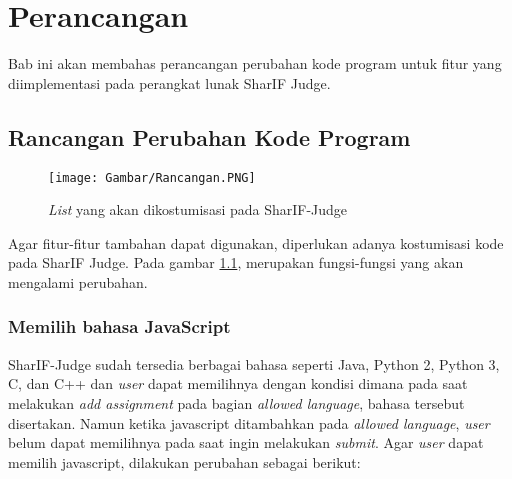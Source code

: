 \chapter{Perancangan}
\label{chap: Perancangan}
Bab ini akan membahas perancangan perubahan kode program untuk fitur yang diimplementasi pada perangkat lunak SharIF Judge.

\section{Rancangan Perubahan Kode Program}
\label{sec: Rancangan Perubahan Kode Program}
\begin{figure}[h!]
     \centering
     \texttt{[image: Gambar/Rancangan.PNG]}
     \caption{\textit{List} yang akan dikostumisasi pada SharIF-Judge}
     \label{fig:Rancangan}
 \end{figure}
 Agar fitur-fitur tambahan dapat digunakan, diperlukan adanya kostumisasi kode pada SharIF Judge. Pada gambar \ref{fig:Rancangan}, merupakan fungsi-fungsi yang akan mengalami perubahan.
 
 \subsection{Memilih bahasa JavaScript}
 SharIF-Judge sudah tersedia berbagai bahasa seperti Java, Python 2, Python 3, C, dan C++ dan \textit{user} dapat memilihnya dengan kondisi dimana pada saat melakukan \textit{add assignment} pada bagian \textit{allowed language}, bahasa tersebut disertakan. Namun ketika javascript ditambahkan pada \textit{allowed language}, \textit{user} belum dapat memilihnya pada saat ingin melakukan \textit{submit}. Agar \textit{user} dapat memilih javascript, dilakukan perubahan sebagai berikut: 
 
